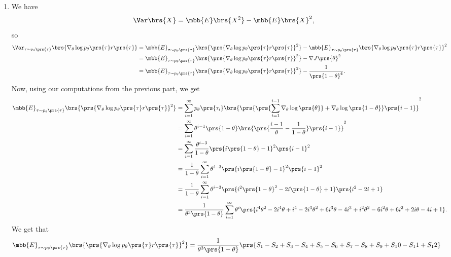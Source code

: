 \documentclass[10pt]{article}
\theoremstyle{definition}
\begin{document}
\begin{enumerate}
\item
We have
\begin{align*}
\Var\brs{X} = \mbb{E}\brs{X^2} - \mbb{E}\brs{X}^2 \text{,}
\end{align*}
so
\begin{align*}
\Var_{\tau \sim p_\theta\prs{\tau}}\brs{\nabla_\theta \log p_\theta\prs{\tau} r\prs{\tau}} &=
\mbb{E}_{\tau \sim p_\theta\prs{\tau}}\brs{\prs{\nabla_\theta \log p_\theta\prs{\tau} r\prs{\tau}}^2}
- \mbb{E}_{\tau \sim p_\theta\prs{\tau}}\brs{\nabla_\theta \log p_\theta\prs{\tau} r\prs{\tau}}^2
\\&=
\mbb{E}_{\tau \sim p_\theta\prs{\tau}}\brs{\prs{\nabla_\theta \log p_\theta\prs{\tau} r\prs{\tau}}^2}
- \nabla J\prs{\theta}^2
\\&=
\mbb{E}_{\tau \sim p_\theta\prs{\tau}}\brs{\prs{\nabla_\theta \log p_\theta\prs{\tau} r\prs{\tau}}^2} - \frac{1}{\prs{1 - \theta}^4} \text{.}
\end{align*}
Now, using our computations from the previous part, we get
\begin{align*}
\mbb{E}_{\tau \sim p_\theta\prs{\tau}}\brs{\prs{\nabla_\theta \log p_\theta\prs{\tau} r\prs{\tau}}^2} &=
\sum_{i=1}^{\infty} p_\theta\prs{\tau_i} \brs{\prs{\prs{\sum_{t = 1}^{i-1} \nabla_\theta \log\prs{\theta}} + \nabla_\theta \log\prs{1 - \theta}} \prs{i-1}}^2
\\&=
\sum_{i=1}^{\infty} \theta^{i-1} \prs{1 - \theta} \brs{\prs{\frac{i - 1}{\theta} - \frac{1}{1 - \theta}} \prs{i-1}}^2
\\&=
\sum_{i=1}^{\infty} \frac{\theta^{i-3}}{1 - \theta} \prs{i \prs{1 - \theta} - 1}^2 \prs{i-1}^2
\\&=
\frac{1}{1 - \theta} \sum_{i=1}^{\infty} \theta^{i-3} \prs{i \prs{1 - \theta} - 1}^2 \prs{i-1}^2
\\&=
\frac{1}{1 - \theta} \sum_{i=1}^{\infty} \theta^{i-3} \prs{i^2 \prs{1-\theta}^2 - 2i\prs{1-\theta} + 1} \prs{i^2 -2i + 1}
\\&= 
\frac{1}{\theta^3\prs{1 - \theta}} \sum_{i=1}^{\infty} \theta^i \prs{i^4 \theta^2 -2i^4 \theta +i^4 - 2i^3 \theta^2 + 6i^3 \theta -4i^3 +i^2 \theta^2 - 6i^2 \theta +6 i^2 + 2i\theta -4i + 1} \text{.}
\end{align*}
We get that
\begin{align*}
\mbb{E}_{\tau \sim p_\theta\prs{\tau}}\brs{\prs{\nabla_\theta \log p_\theta\prs{\tau} r\prs{\tau}}^2} &= \frac{1}{\theta^3\prs{1 - \theta}} \prs{S_1 - S_2 + S_3 - S_4 + S_5 - S_6 + S_7 - S_8 + S_9 + S_10 - S_11 + S_12}
\end{align*}

\end{enumerate}
\end{document}

